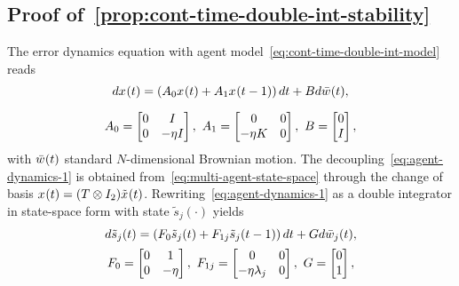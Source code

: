 
\subsection{Proof of~\cref{prop:cont-time-double-int-stability}}\label{app:cont-time-double-int-stability}

The error dynamics equation with agent model~\eqref{eq:cont-time-double-int-model} reads
\begin{equation}\label{eq:multi-agent-state-space}
	\begin{array}{c}
		dx_{}(t) =
			\left(A_0x_{}(t) + A_1x_{}(t-1)\right)dt + Bd\bar{w}_{}(t), \\[10pt]
		A_0 = \begin{bmatrix}
			0 & I\\
			0 & -\eta I
		\end{bmatrix}, \
		A_1 = \begin{bmatrix}
			0 & 0\\
			-\eta K & 0
		\end{bmatrix}, \
		B = \begin{bmatrix}
			0\\
			I
		\end{bmatrix},
	\end{array}
\end{equation}
with $ \bar{w}_{}(t) $ standard $ N $-dimensional Brownian motion.
The decoupling~\eqref{eq:agent-dynamics-1}
is obtained from~\eqref{eq:multi-agent-state-space} through
the change of basis $ x_{}(t) = (T\otimes I_2)\tilde{x}_{}(t) $.
Rewriting~\eqref{eq:agent-dynamics-1} as a double integrator in state-space form 
with state $ \tilde{s}_j(\cdot) $ yields
\begin{equation}\label{eq:2n-order-system-state-space-1}
	\begin{array}{c}
		d\tilde{s}_j(t) = \left(F_0\tilde{s}_j(t)+F_{1j}\tilde{s}_j(t-1)\right)dt + Gd\bar{w}_{j}(t), \\[5pt]
		 F_0 = \begin{bmatrix}
			0 & 1\\
			0 & -\eta
		\end{bmatrix}, \ F_{1j} = \begin{bmatrix}
			0 & 0\\
			-\eta\lambda_j & 0
		\end{bmatrix}, \ G = \begin{bmatrix}
			0\\
			1
		\end{bmatrix},
	\end{array}
\end{equation}
